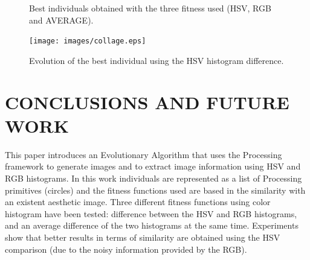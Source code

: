 \documentclass[a4paper,twoside]{article}
\begin{document}
\begin{figure}[ht]
{ }
\caption{Best individuals obtained with the three fitness used (HSV, RGB and AVERAGE).}
\label{fig:bestinds}
\end{figure}

\begin{figure}
   \texttt{[image: images/collage.eps]}
\caption{Evolution of the best individual using the HSV histogram difference. }
\label{fig:collage}
\end{figure}

\section{\uppercase{Conclusions and Future Work}}
\label{sec:conclusions}
\noindent This paper introduces an Evolutionary Algorithm that uses the Processing framework to generate images and to extract image information using HSV and RGB histograms. %
In this work individuals are represented as a list of Processing primitives (circles) and the fitness functions used are based in the similarity with an existent aesthetic image. Three different fitness functions using color histogram have been tested: difference between the HSV and RGB histograms, and an average difference of the two histograms at the same time. Experiments show that better results in terms of similarity are obtained using the HSV comparison (due to the noisy information provided by the RGB). 
\end{document}
